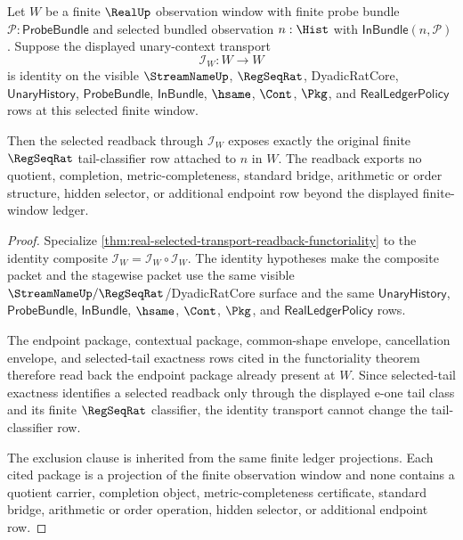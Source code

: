 \begin{theorem}
\label{thm:real-selected-transport-readback-identity}
Let $W$ be a finite $\RealUp$ observation window with finite probe bundle
$\mathcal{P}:\mathsf{ProbeBundle}$ and selected bundled observation
$n:\Hist$ with $\mathsf{InBundle}(n,\mathcal{P})$. Suppose the displayed
unary-context transport
$$
\mathcal{I}_W:W\to W
$$
is identity on the visible $\StreamNameUp$, $\RegSeqRat$, DyadicRatCore,
$\mathsf{UnaryHistory}$, $\mathsf{ProbeBundle}$, $\mathsf{InBundle}$,
$\hsame$, $\Cont$, $\Pkg$, and $\mathsf{RealLedgerPolicy}$ rows at this
selected finite window.

Then the selected readback through $\mathcal{I}_W$ exposes exactly the
original finite $\RegSeqRat$ tail-classifier row attached to $n$ in $W$.
The readback exports no quotient, completion, metric-completeness, standard
bridge, arithmetic or order structure, hidden selector, or additional endpoint
row beyond the displayed finite-window ledger.
\end{theorem}
\begin{proof}
Specialize \autoref{thm:real-selected-transport-readback-functoriality} to the
identity composite $\mathcal{I}_W=\mathcal{I}_W\circ\mathcal{I}_W$. The
identity hypotheses make the composite packet and the stagewise packet use the
same visible $\StreamNameUp/\RegSeqRat$/DyadicRatCore surface and the same
$\mathsf{UnaryHistory}$, $\mathsf{ProbeBundle}$, $\mathsf{InBundle}$,
$\hsame$, $\Cont$, $\Pkg$, and $\mathsf{RealLedgerPolicy}$ rows.

The endpoint package, contextual package, common-shape envelope, cancellation
envelope, and selected-tail exactness rows cited in the functoriality theorem
therefore read back the endpoint package already present at $W$. Since
selected-tail exactness identifies a selected readback only through the
displayed e-one tail class and its finite $\RegSeqRat$ classifier, the
identity transport cannot change the tail-classifier row.

The exclusion clause is inherited from the same finite ledger projections.
Each cited package is a projection of the finite observation window and none
contains a quotient carrier, completion object, metric-completeness
certificate, standard bridge, arithmetic or order operation, hidden selector,
or additional endpoint row.
\end{proof}

